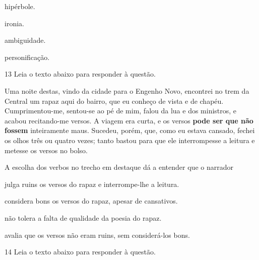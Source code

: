 \begin{escolha}

    \item hipérbole. 

    \item ironia. 

    \item ambiguidade. 

    \item personificação. 

\end{escolha}

\num{13} Leia o texto abaixo para responder à questão. 

\begin{myquote}

Uma noite destas, vindo da cidade para o Engenho
Novo, encontrei no trem da Central um rapaz aqui do
bairro, que eu conheço de vista e de chapéu. 
Cumprimentou-me, sentou-se ao pé de mim, falou da lua
e dos ministros, e acabou recitando-me versos. A viagem 
era curta, e os versos \textbf{pode ser que não fossem} 
inteiramente maus. Sucedeu, porém, que, como eu estava 
cansado, fechei os olhos três ou quatro vezes; tanto 
bastou para que ele interrompesse a leitura e metesse 
os versos no bolso.


\end{myquote}

A escolha dos verbos no trecho em destaque dá a entender que o narrador

\begin{escolha}

  \item julga ruins os versos do rapaz e interrompe-lhe a leitura.

  \item considera bons os versos do rapaz, apesar de cansativos.

  \item não tolera a falta de qualidade da poesia do rapaz.

  \item avalia que os versos não eram ruins, sem considerá-los bons.

\end{escolha}

\num{14} Leia o texto abaixo para responder à questão. 

